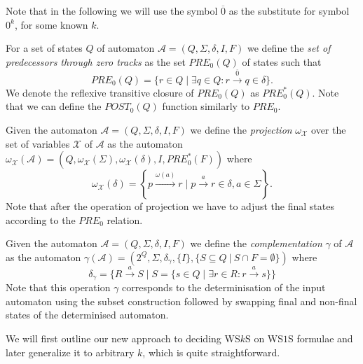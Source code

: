 Note that in the following we will use the symbol $\overline{0}$ as the
substitute for symbol $0^k$, for some known $k$.

\begin{defz}
For a set of states $Q$ of automaton $\mathcal{A} = (Q, \Sigma, \delta, I, F)$
we define the \emph{set of predecessors through zero tracks} as the set $\mathit{PRE}_0(Q)$ of states such that
\begin{equation}
 \mathit{PRE}_0(Q) = \{r \in Q \mid \exists q \in Q: r
 \overset{\overline{0}}{\longrightarrow} q \in \delta\}.
\end{equation}
We denote the reflexive transitive closure of $PRE_0(Q)$ as $PRE_0^*(Q)$. Note
that we can define the $POST_0(Q)$ function similarly to $PRE_0$.
\end{defz}

\begin{defz}
 Given the automaton $\mathcal{A} = (Q, \Sigma, \delta, I, F)$ we define the
 \emph{projection} $\omega_\mathcal{X}$ over the set of variables $\mathcal{X}$
 of $\mathcal{A}$ as the automaton $\omega_\mathcal{X}(\mathcal{A}) = (Q,
 \omega_{\mathcal{X}}(\Sigma), \omega_{\mathcal{X}}(\delta), I, PRE_0^*(F))$
 where
 \begin{equation}
  \omega_{\mathcal{X}}(\delta) = \left\{ p \overset{\omega(a)}{\longrightarrow}
  r \mid p \overset{a}{\rightarrow} r \in \delta, a \in \Sigma\right\}.
 \end{equation}
 Note that after the operation of projection we have to adjust the final states
 according to the $PRE_0$ relation.
\end{defz}

\begin{defz}
 Given the automaton $\mathcal{A} = (Q, \Sigma, \delta, I, F)$ we define the
 \emph{complementation} $\gamma$ of $\mathcal{A}$ as the automaton
 $\gamma(\mathcal{A}) = (2^Q, \Sigma, \delta_\gamma, \{I\}, \{S \subseteq Q\
 |\ S \cap F = \emptyset\})$ where
 \begin{equation}
  \delta_\gamma = \{R \overset{a}{\rightarrow} S \mid S = \{s \in Q \mid \exists
  r \in R: r \overset{a}{\rightarrow} s\}\}
 \end{equation}
 Note that this operation $\gamma$ corresponds to the determinisation of the
 input automaton using the subset construction followed by swapping final and
 non-final states of the determinised automaton.
\end{defz}

We will first outline our new approach to deciding WS$k$S on WS$1$S formulae and
later generalize it to arbitrary $k$, which is quite straightforward.

